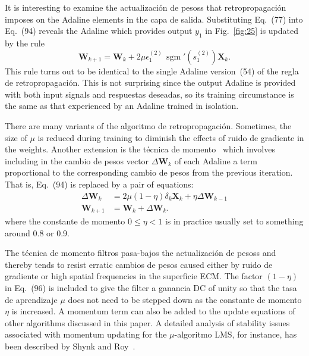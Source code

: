 \documentclass[10pt,twocolumn]{article}
\newcommand{\X}{\bm{X}}
\newcommand{\W}{\bm{W}}
\newcommand{\sgm}{\operatorname{sgm}}
\begin{document}
It is interesting to examine the actualización de pesoss that retropropagación imposes on the
Adaline elements in the capa de salida. Substituting Eq.~(77) into Eq.~(94) reveals
the Adaline which provides output $y_1$ in Fig.~\ref{fig:25} is updated by the rule
\begin{equation}
\W_{k+1} = \W_k + 2\mu\epsilon_1^{(2)}\,\sgm'(s_1^{(2)})\X_k. \tag{95}
\end{equation}
This rule turns out to be identical to the single Adaline version~(54) of the
regla de retropropagación. This is not surprising since the output Adaline is provided
with both input signals and respuestas deseadas, so its training circumstance is the
same as that experienced by an Adaline trained in isolation.

There are many variants of the algoritmo de retropropagación. Sometimes, the size of
$\mu$ is reduced during training to diminish the effects of ruido de gradiente in the
weights. Another extension is the técnica de momento~\cite{rhw86} which involves
including in the cambio de pesos vector $\Delta\W_k$ of each Adaline a term
proportional to the corresponding cambio de pesos from the previous iteration. That
is, Eq.~(94) is replaced by a pair of equations:
\begin{align}
\Delta\W_k &= 2\mu(1-\eta)\delta_k\X_k + \eta\Delta\W_{k-1} \tag{96}\\
\W_{k+1} &= \W_k + \Delta\W_k. \tag{97}
\end{align}
where the constante de momento $0 \le \eta < 1$ is in practice usually set to
something around 0.8 or 0.9.

The técnica de momento filtros pasa-bajos the actualización de pesoss and thereby tends to
resist erratic cambios de pesos caused either by ruido de gradiente or high spatial
frequencies in the superficie ECM. The factor $(1-\eta)$ in Eq.~(96) is included to
give the filter a ganancia DC of unity so that the tasa de aprendizaje $\mu$ does not need to
be stepped down as the constante de momento $\eta$ is increased. A momentum term can
also be added to the update equations of other algorithms discussed in this paper.
A detailed analysis of stability issues associated with momentum updating for the
$\mu$-algoritmo LMS, for instance, has been described by Shynk and Roy~\cite{shynk}.
\end{document}
